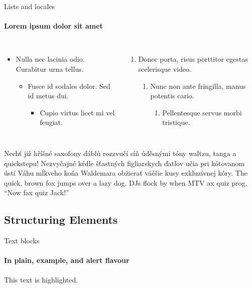 \documentclass{beamer}
\begin{document}
\begin{darkframes}
    \begin{frame}[label=lists]{Lists and locales}
      \framesubtitle{Lorem ipsum dolor sit amet}
      \begin{columns}[onlytextwidth]
          \begin{itemize}
            \item Nulla nec lacinia odio. Curabitur urna tellus.
            \begin{itemize}
              \item Fusce id sodales dolor. Sed id metus dui.
              \begin{itemize}
                \item Cupio virtus licet mi vel feugiat.
              \end{itemize}
            \end{itemize}
          \end{itemize}
          \begin{enumerate}
            \item Donec porta, risus porttitor egestas scelerisque video.
            \begin{enumerate}
              \item Nunc non ante fringilla, manus potentis cario.
              \begin{enumerate}
                \item Pellentesque servus morbi tristique.
              \end{enumerate}
            \end{enumerate}
          \end{enumerate}
      \end{columns}
      \bigskip
      \justifying

      {Nechť již hříšné saxofony ďáblů
      rozzvučí síň úděsnými tóny waltzu, tanga a quickstepu!}
      { Nezvyčajné kŕdle šťastných figliarskych
      ďatľov učia pri kótovanom ústí Váhu mĺkveho koňa Waldemara
      obžierať väč\-šie kusy exkluzívnej kôry.}
      {The quick, brown fox jumps over a lazy
      dog. DJs flock by when MTV ax quiz prog. “Now fax quiz Jack!”}
    \end{frame}

    \subsection{Structuring Elements}
    \begin{frame}[label=simmonshall]{Text blocks}
      \framesubtitle{In plain, example, and \alert{alert} flavour}
      \alert{This text} is highlighted.


\end{frame}
\end{darkframes}
\end{document}
